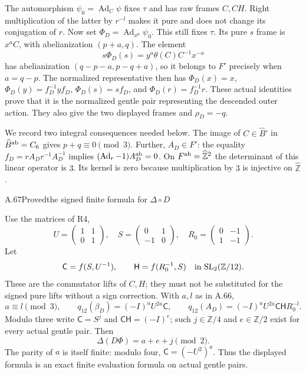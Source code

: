 The automorphism $\psi_0=\operatorname{Ad}_C\psi$ fixes $\tau$ and
has raw frames $C,CH$. Right multiplication of the latter by $r^{-l}$
makes it pure and does not change its conjugation of $r$. Now set
$\Phi_D=\operatorname{Ad}_{x^a}\psi_0$. This still fixes $\tau$.
Its pure $s$ frame is $x^aC$, with abelianization $(p+a,q)$.
The element
\[
 s\Phi_D(s)=y^a\theta(C)C^{-1}x^{-a}
\]
has abelianization $(q-p-a,p-q+a)$, so it belongs to $F'$ precisely
when $a=q-p$. The normalized representative then has
$\Phi_D(x)=x$, $\Phi_D(y)=f_D^{-1}yf_D$,
$\Phi_D(s)=sf_D$, and $\Phi_D(r)=f_D^{-1}r$.
These actual identities prove that it is the normalized gentle pair
representing the descended outer action. They also give the two
displayed frames and $\rho_D=-q$.

We record two integral consequences needed below. The image of
$C\in\widehat B'$ in $\widehat B^{\rm ab}=C_6$ gives
$p+q\equiv0\pmod3$. Further, $A_D\in F'$: the equality
$f_D=rA_Dr^{-1}A_D^{-1}$ implies
$(\operatorname{Ad}_r-1)A_D^{\rm ab}=0$. On
$F^{\rm ab}=\widehat{\mathbb Z}^2$ the determinant of this linear
operator is $3$. Its kernel is zero because multiplication by $3$
is injective on $\widehat{\mathbb Z}$.

\begin{statement}{A.67}{Proved}{the signed finite formula for $\Delta\circ D$}
\end{statement}
Use the matrices of R4,
\[
 U=\begin{pmatrix}1&1\\0&1\end{pmatrix},\quad
 S=\begin{pmatrix}0&1\\-1&0\end{pmatrix},\quad
 R_0=\begin{pmatrix}0&-1\\1&-1\end{pmatrix}.
\]
Let
\[
 \mathsf C=f(S,U^{-1}),\qquad
 \mathsf H=f(R_0^{-1},S)
       \quad\hbox{in }\mathrm{SL}_2(\mathbb Z/12).
\]
These are the commutator lifts of $C,H$; they must not be substituted
for the signed pure lifts without a sign correction. With $a,l$ as
in A.66,
\[
 a\equiv l\pmod3,\qquad
 q_{12}(\beta_D)=(-I)^aU^{2a}\mathsf C,\qquad
 q_{12}(A_D)=(-I)^aU^{2a}\mathsf C\mathsf H R_0^{-l}.
\]
Modulo three write
$\mathsf C=S^j$ and $\mathsf C\mathsf H=(-I)^e$; such
$j\in\mathbb Z/4$ and $e\in\mathbb Z/2$ exist for every actual
gentle pair. Then
\[
 \boxed{\ \Delta(D\Phi)=a+e+j\pmod2.\ }
\]
The parity of $a$ is itself finite: modulo four,
$\mathsf C=(-U^2)^a$. Thus the displayed formula is an exact
finite evaluation formula on actual gentle pairs.

